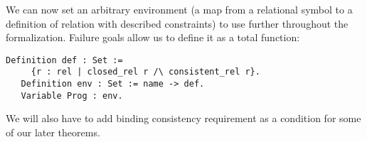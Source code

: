 We can now set an arbitrary environment (a map from a relational symbol to a definition of relation with described constraints) to use further throughout the formalization.
Failure goals allow us to define it as a total function:

\begin{lstlisting}[language=Coq]
   Definition def : Set := 
     {r : rel | closed_rel r /\ consistent_rel r}.
   Definition env : Set := name -> def.
   Variable Prog : env.
\end{lstlisting}

We will also have to add binding consistency requirement as a condition for some of our later theorems.
